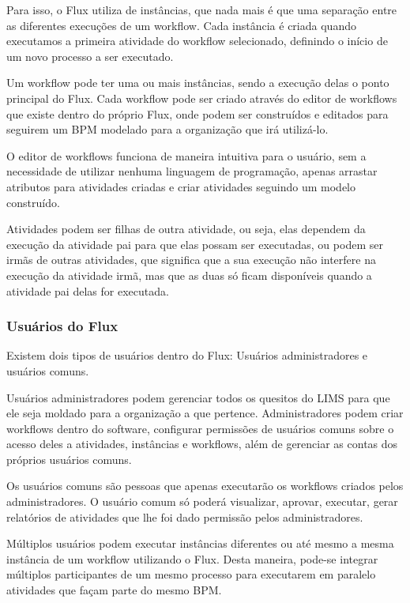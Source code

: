Para isso, o Flux utiliza de instâncias, que nada mais é que uma separação entre as diferentes execuções de um workflow. Cada instância é criada quando executamos a primeira atividade do workflow selecionado, definindo o início de um novo processo a ser executado.

Um workflow pode ter uma ou mais instâncias, sendo a execução delas o ponto principal do Flux.
Cada workflow pode ser criado através do editor de workflows que existe dentro do próprio Flux, onde podem ser construídos e editados para seguirem um BPM modelado para a organização que irá utilizá-lo.

O editor de workflows funciona de maneira intuitiva para o usuário, sem a necessidade de utilizar nenhuma linguagem de programação, apenas arrastar atributos para atividades criadas e criar atividades seguindo um modelo construído.

Atividades podem ser filhas de outra atividade, ou seja, elas dependem da execução da atividade pai para que elas possam ser executadas, ou podem ser irmãs de outras atividades, que significa que a sua execução não interfere na execução da atividade irmã, mas que as duas só ficam disponíveis quando a atividade pai delas for executada.

\subsubsection{Usuários do Flux}

Existem dois tipos de usuários dentro do Flux: Usuários administradores e usuários comuns.

Usuários administradores podem gerenciar todos os quesitos do LIMS para que ele seja moldado para a organização a que pertence. Administradores podem criar workflows dentro do software, configurar permissões de usuários comuns sobre o acesso deles a atividades, instâncias e workflows, além de gerenciar as contas dos próprios usuários comuns.

Os usuários comuns são pessoas que apenas executarão os workflows criados pelos administradores. O usuário comum só poderá visualizar, aprovar, executar, gerar relatórios de atividades que lhe foi dado permissão pelos administradores.

Múltiplos usuários podem executar instâncias diferentes ou até mesmo a mesma instância de um workflow utilizando o Flux. Desta maneira, pode-se integrar múltiplos participantes de um mesmo processo para executarem em paralelo atividades que façam parte do mesmo BPM.